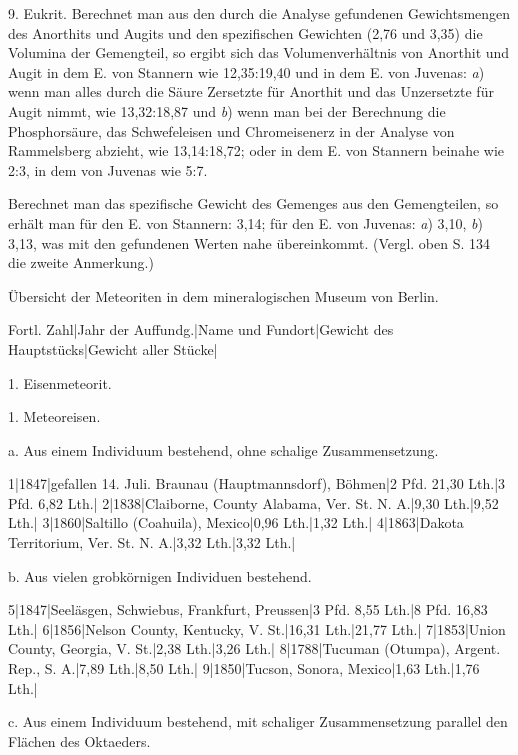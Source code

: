 \documentclass[a4paper, 11pt, oneside]{article}
\begin{document}
9. Eukrit. Berechnet man aus den durch die Analyse gefundenen Gewichtsmengen des Anorthits und Augits und den spezifischen Gewichten (2,76 und 3,35) die Volumina der Gemengteil, so ergibt sich das Volumenverhältnis von Anorthit und Augit in dem E. von Stannern wie 12,35:19,40 und in dem E. von Juvenas: \emph{a}) wenn man alles durch die Säure Zersetzte für Anorthit und das Unzersetzte für Augit nimmt, wie 13,32:18,87 und \emph{b}) wenn man bei der Berechnung die Phosphorsäure, das Schwefeleisen und Chromeisenerz in der Analyse von Rammelsberg abzieht, wie 13,14:18,72; oder in dem E. von Stannern beinahe wie 2:3, in dem von Juvenas wie 5:7.

Berechnet man das spezifische Gewicht des Gemenges aus den Gemengteilen, so erhält man für den E. von Stannern: 3,14; für den E. von Juvenas: \emph{a}) 3,10, \emph{b}) 3,13, was mit den gefundenen Werten nahe übereinkommt. (Vergl. oben S. 134 die zweite Anmerkung.)

Übersicht der Meteoriten in dem mineralogischen Museum von Berlin.

Fortl. Zahl|Jahr der Auffundg.|Name und Fundort|Gewicht des Hauptstücks|Gewicht aller Stücke|

1. Eisenmeteorit.  

1. Meteoreisen.  

a. Aus einem Individuum bestehend, ohne schalige Zusammensetzung.  

1|1847|gefallen 14. Juli. Braunau (Hauptmannsdorf), Böhmen|2 Pfd. 21,30 Lth.|3 Pfd. 6,82 Lth.|  
2|1838|Claiborne, County Alabama, Ver. St. N. A.|9,30 Lth.|9,52 Lth.|  
3|1860|Saltillo (Coahuila), Mexico|0,96 Lth.|1,32 Lth.|  
4|1863|Dakota Territorium, Ver. St. N. A.|3,32 Lth.|3,32 Lth.|  

b. Aus vielen grobkörnigen Individuen bestehend.  

5|1847|Seeläsgen, Schwiebus, Frankfurt, Preussen|3 Pfd. 8,55 Lth.|8 Pfd. 16,83 Lth.|  
6|1856|Nelson County, Kentucky, V. St.|16,31 Lth.|21,77 Lth.|  
7|1853|Union County, Georgia, V. St.|2,38 Lth.|3,26 Lth.|  
8|1788|Tucuman (Otumpa), Argent. Rep., S. A.|7,89 Lth.|8,50 Lth.|  
9|1850|Tucson, Sonora, Mexico|1,63 Lth.|1,76 Lth.|  

c. Aus einem Individuum bestehend, mit schaliger Zusammensetzung parallel den Flächen des Oktaeders.  
\end{document}
